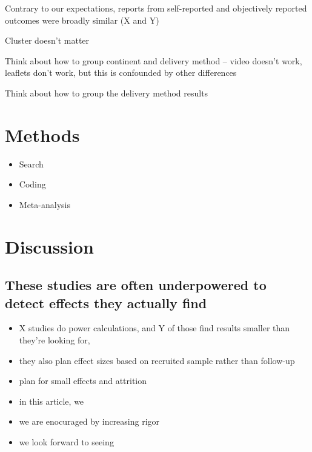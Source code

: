 \documentclass[sn-nature,pdflatex]{sn-jnl}
\providecommand{\tightlist}{%
  \setlength{\itemsep}{0pt}\setlength{\parskip}{0pt}}
\begin{document}
Contrary to our expectations, reports from self-reported and objectively
reported outcomes were broadly similar (X and Y)

Cluster doesn't matter

Think about how to group continent and delivery method -- video doesn't
work, leaflets don't work, but this is confounded by other differences

Think about how to group the delivery method results

\section{Methods}\label{sec3}

\begin{itemize}
\tightlist
\item
  Search
\item
  Coding
\item
  Meta-analysis
\end{itemize}

\section{Discussion}\label{sec4}

\subsection{These studies are often underpowered to detect effects they
actually find}\label{Sec4.1}

\begin{itemize}
\tightlist
\item
  X studies do power calculations, and Y of those find results smaller
  than they're looking for,
\item
  they also plan effect sizes based on recruited sample rather than
  follow-up
\item
  plan for small effects and attrition
\end{itemize}

\begin{itemize}
\tightlist
\item
  in this article, we
\item
  we are enocuraged by increasing rigor
\item
  we look forward to seeing
\end{itemize}

\backmatter

\end{document}

